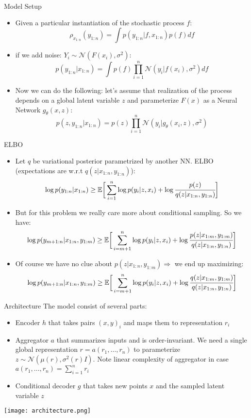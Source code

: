\documentclass{beamer}%
\theoremstyle{definition}
\newcommand{\E}{\mathbb{E}}
\begin{document}
\begin{frame}{Model Setup}
    \begin{itemize}
        \item Given a particular instantiation of the stochastic process $f$:
        $$
            \rho_{x_{1:n}}(y_{1:n}) = \int p(y_{1:n}|f, x_{1:n})p(f)df
        $$
        \item if we add noise: $Y_i \sim \mathcal{N}(F(x_i), \sigma^2)$:
        $$
        p(y_{1:n}|x_{1:n}) = \int p(f)\prod_{i=1}^n \mathcal{N}(y_i|f(x_i), \sigma^2)df
        $$
        \item Now we can do the following: let's assume that realization of the process depends on a global latent variable $z$ and parameterize $F(x)$ as a Neural Network $g_{\theta}(x, z)$:
        $$
        p(z, y_{1:n}|x_{1:n}) = p(z) \prod_{i=1}^n 
        \mathcal{N}(y_i|g_{\theta}(x_i, z), \sigma^2)
        $$
    \end{itemize}
\end{frame}

\begin{frame}{ELBO}
\begin{itemize}
    \item Let $q$ be variational posterior parametrized by another NN. ELBO (expectations are w.r.t $q(z|x_{1:n}, y_{1:n})$):
    $$
    \log p(y_{1:n}|x_{1:n}) \geq 
    \E\bigg[
    \sum_{i=1}^n \log p(y_i|z, x_i) + 
    \log \cfrac{p(z)}{q(z|x_{1:n}, y_{1:n})} 
    \bigg]
    $$
    \item But for this problem we really care more about conditional sampling. So we have:
    $$
    \log p(y_{m+1:n}|x_{1:n}, y_{1:m}) \geq 
    \E \bigg[
    \sum_{i=m+1}^n \log p(y_i|z, x_i) + 
    \log \cfrac{p(z|x_{1:m}, y_{1:m})}{q(z|x_{1:n}, y_{1:n})} 
    \bigg]
    $$
    \item Of course we have no clue about $p(z|x_{1:n}, y_{1:m}) \Rightarrow$ we end up maximizing:
    $$
    \log p(y_{m+1:n}|x_{1:n}, y_{1:m}) \geq 
    \E \bigg[
    \sum_{i=m+1}^n \log p(y_i|z, x_i) + 
    \log \cfrac{q(z|x_{1:m}, y_{1:m})}{q(z|x_{1:n}, y_{1:n})} 
    \bigg]    
    $$
\end{itemize}
    
\end{frame}

\begin{frame}{Architecture}
    The model consist of several parts:
    \begin{itemize}
        \item Encoder $h$ that takes pairs $(x, y)_i$ and maps them to representation $r_i$
        \item Aggregator $a$ that summarizes inputs and is order-invariant. We need a single global representation $r = a(r_1, \ldots, r_n)$ to parameterize $z \sim \mathcal{N}(\mu(r), \sigma^2(r)I)$. Note linear complexity of aggregator in case $a(r_1, \ldots, r_n) = \sum_{i=1}^n r_i$
        \item Conditional decoder $g$ that takes new points $x$ and the sampled latent variable $z$
    \end{itemize}
    \texttt{[image: architecture.png]}
\end{frame}
\end{document}
